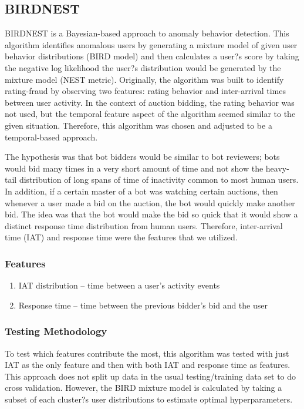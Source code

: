 \documentclass{article} %
\begin{document}
\subsection{BIRDNEST}

BIRDNEST is a Bayesian-based approach to anomaly behavior detection.
This algorithm identifies anomalous users by generating a mixture model of given user behavior distributions (BIRD model) and then calculates a user?s score by taking the negative log likelihood the user?s distribution would be generated by the mixture model (NEST metric).
Originally, the algorithm was built to identify rating-fraud by observing two features: rating behavior and inter-arrival times between user activity.
In the context of auction bidding, the rating behavior was not used, but the temporal feature aspect of the algorithm seemed similar to the given situation.
Therefore, this algorithm was chosen and adjusted to be a temporal-based approach.

The hypothesis was that bot bidders would be similar to bot reviewers; bots would bid many times in a very short amount of time and not show the heavy-tail distribution of long spans of time of inactivity common to most human users.
In addition, if a certain master of a bot was watching certain auctions, then whenever a user made a bid on the auction, the bot would quickly make another bid.
The idea was that the bot would make the bid so quick that it would show a distinct response time distribution from human users.
Therefore, inter-arrival time (IAT) and response time were the features that we utilized.

\subsubsection{Features}

\begin{enumerate}
\item IAT distribution -- time between a user's activity events
\item Response time -- time between the previous bidder's bid and the user
\end{enumerate}

\subsubsection{Testing Methodology}

To test which features contribute the most, this algorithm was tested with just IAT as the only feature and then with both IAT and response time as features.
This approach does not split up data in the usual testing/training data set to do cross validation.
However, the BIRD mixture model is calculated by taking a subset of each cluster?s user distributions to estimate optimal hyperparameters.
\end{document}
